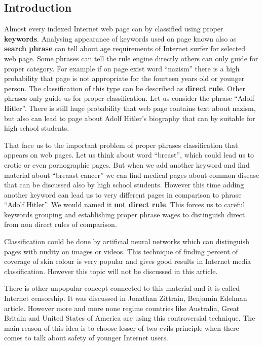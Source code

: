 \documentclass[9pt,a4paper]{extarticle}
\begin{document}
\begin{multicols}{2}
\section{Introduction}
Almost every indexed Internet web page can by classified using proper \textbf{keywords}. Analysing appearance of keywords used on page known also as \textbf{search phrase} can tell about age requirements of Internet surfer for selected web page. Some phrases can tell the rule engine directly others can only guide for proper category. For example if on page exist word ``nazism'' there is a high probability that page is not appropriate for the fourteen years old or younger person. The classification of this type can be described as \textbf{direct rule}. Other phrases only guide us for proper classification. 
Let us consider the phrase ``Adolf Hitler''. 
There is still huge probability that web page contains text about nazism, but also can lead to page about Adolf Hitler's biography that can by suitable for high school students.

That face us to the important problem of proper phrases classification that appears on web pages. 
Let us think about
word ``breast'', which could lead us to erotic or even pornographic pages. But when we add another keyword and find material about
``breaast cancer'' we can find medical pages about common disease that can be discussed also by high school students. However this time adding another keyword can lead us to very different pages in comparison to phrase
``Adolf Hitler''. We would named it \textbf{not direct rule}. This forces us to careful keywords grouping and establishing proper phrase wages to distinguish direct from non direct rules of comparison.

Classification could be done by artificial neural networks which can distinguish pages with nudity on images or videos\cite{will_archer_arentz_classifying_nodate, radhouane_guermazi_combining_2007, giuseppe_amato_detection_2009}. This technique of finding percent of coverage of skin colour is very popular and gives good results in Internet media classification\cite{mohammad_reza_mahmoodi_high_nodate,paul_greenfield_netalert_2001}. However this topic will not be discussed in this article.

There is other unpopular concept connected to this material and it is called Internet censorship. It was discussed in Jonathan Zittrain, Benjamin Edelman article\cite{jonathan_zittrain_internet_2003}. However more and more none regime countries like Australia, Great Britain and United States of America are using this controversial technique. The main reason of this idea is to choose lesser of two evils principle when there comes to talk about safety of younger Internet users\cite{piotr_luczuk_cyberwojna_2016,john_g._palfrey_jr._four_2010}.


\end{multicols}
\end{document}
